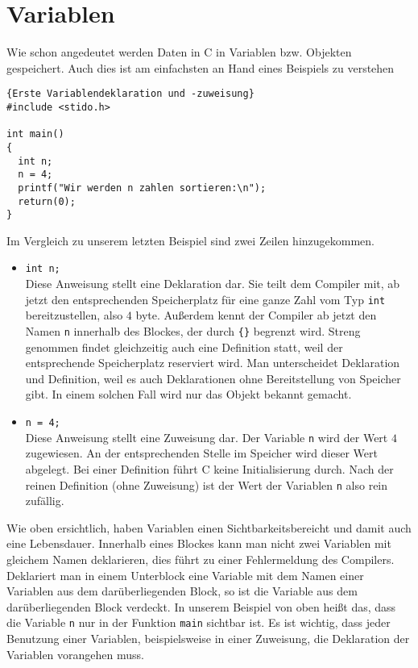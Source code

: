 \section{Variablen}

Wie schon angedeutet werden Daten in C in Variablen bzw. Objekten gespeichert.
Auch dies ist am einfachsten an Hand eines Beispiels zu verstehen
\begin{lstlisting}{Erste Variablendeklaration und -zuweisung}
#include <stido.h>

int main()
{
  int n;
  n = 4;
  printf("Wir werden n zahlen sortieren:\n");
  return(0);
}
\end{lstlisting}
Im Vergleich zu unserem letzten Beispiel sind zwei Zeilen hinzugekommen. 
\begin{itemize}
\item \texttt{int n;}\\
  Diese Anweisung stellt eine Deklaration dar. 
  Sie teilt dem Compiler mit, ab jetzt den entsprechenden Speicherplatz für eine ganze Zahl vom Typ \texttt{int} bereitzustellen, also $4$ byte.
  Außerdem kennt der Compiler ab jetzt den Namen \texttt{n} innerhalb des Blockes, der durch \texttt{\{\}} begrenzt wird.
  Streng genommen findet gleichzeitig auch eine Definition statt, weil der entsprechende Speicherplatz reserviert wird. 
  Man unterscheidet Deklaration und Definition, weil es auch Deklarationen ohne Bereitstellung von Speicher gibt.
  In einem solchen Fall wird nur das Objekt bekannt gemacht.

\item \verb|n = 4;|\\
  Diese Anweisung stellt eine Zuweisung dar.
  Der Variable \texttt{n} wird der Wert $4$ zugewiesen.
  An der entsprechenden Stelle im Speicher wird dieser Wert abgelegt.
  Bei einer Definition führt C keine Initialisierung durch.
  Nach der reinen Definition (ohne Zuweisung) ist der Wert der Variablen \texttt{n} also rein zufällig.
\end{itemize}
Wie oben ersichtlich, haben Variablen einen Sichtbarkeitsbereicht und damit auch eine Lebensdauer.
Innerhalb eines Blockes kann man nicht zwei Variablen mit gleichem Namen deklarieren, dies führt zu einer Fehlermeldung des Compilers.
Deklariert man in einem Unterblock eine Variable mit dem Namen einer Variablen aus dem darüberliegenden Block, so ist die Variable aus dem darüberliegenden Block verdeckt.
In unserem Beispiel von oben heißt das, dass die Variable \texttt{n} nur in der Funktion \texttt{main} sichtbar ist. 
Es ist wichtig, dass jeder Benutzung einer Variablen, beispielsweise in einer Zuweisung, die Deklaration der Variablen vorangehen muss.

